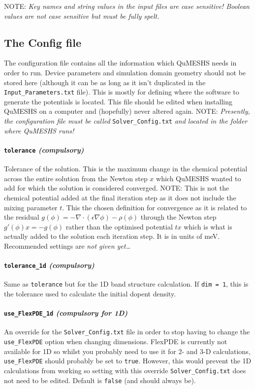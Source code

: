 \documentclass[12pt]{article}
\newcommand{\red}[1]{{\color{red} \it #1}}
\begin{document}
{\color{red} NOTE:} \emph{Key names and string values in the input files are case
sensitive!  Boolean values are not case sensitive but must be fully spelt.}

\subsection{The Config file}
\label{subsec:ConfigFile}

The configuration file contains all the information which QuMESHS needs in order
to run.  Device parameters and simulation domain geometry should not be stored here
(although it can be as long as it isn't duplicated in the \texttt{Input\_Parameters.txt}
file).  This is mostly for defining where the software to generate the potentials is
located.  This file should be edited when installing QuMESHS on a computer and
(hopefully) never altered again.  {\color{red} NOTE:} \emph{Presently, the
configuration file must be called} \texttt{Solver\_Config.txt} \emph{and located in
the folder where QuMESHS runs!}

\paragraph{\texttt{tolerance} \emph{(compulsory)}}
Tolerance of the solution.  This is the maximum change in the chemical potential
across the entire solution from the Newton step $x$ which QuMESHS wanted to add
for which the solution is considered converged.  {\color{red} NOTE:} This is not
the chemical potential added at the final iteration step as it does not include
the mixing parameter $t$.  This the chosen definition for convergence as it is
related to the residual $g(\phi) = - \nabla \cdot ( \epsilon \nabla \phi ) -
\rho (\phi)$ through the Newton step $g' (\phi) x = - g (\phi)$ rather than the
optimised potential $t x$ which is what is actually added to the solution each
iteration step.  It is in units of meV.  Recommended settings are \red{not given
yet\ldots}

\paragraph{\texttt{tolerance\_1d} \emph{(compulsory)}}
Same as \texttt{tolerance} but for the 1D band structure calculation.  If
\texttt{dim = 1}, this is the tolerance used to calculate the initial dopent
density.

\paragraph{\texttt{use\_FlexPDE\_1d} \emph{(compulsory for 1D)}}
An override for the \texttt{Solver\_Config.txt} file in order to stop having
to change the \texttt{use\_FlexPDE} option when changing dimensions.  FlexPDE
is currently not available for 1D so whilst you probably need to use it for
2- and 3-D calculations, \texttt{use\_FlexPDE} should probably be set to
\texttt{true}.  However, this would prevent the 1D calculations from working
so setting with this override \texttt{Solver\_Config.txt} does not need to be
edited.  Default is \texttt{false} (and should always be).
\end{document}
